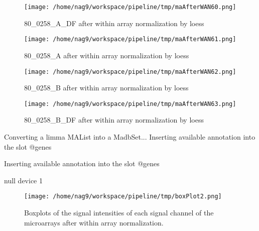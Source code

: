 \documentclass[titlepage]{article}
\begin{document}
\begin{figure}[htb!]
\centering\texttt{[image: /home/nag9/workspace/pipeline/tmp/maAfterWAN60.png]}
\caption{80\_0258\_A\_DF after within array normalization by loess}
 \end{figure}\pagebreak
\begin{figure}[htb!]
\centering\texttt{[image: /home/nag9/workspace/pipeline/tmp/maAfterWAN61.png]}
\caption{80\_0258\_A after within array normalization by loess}
 \end{figure}\pagebreak
\begin{figure}[htb!]
\centering\texttt{[image: /home/nag9/workspace/pipeline/tmp/maAfterWAN62.png]}
\caption{80\_0258\_B after within array normalization by loess}
 \end{figure}\pagebreak
\begin{figure}[htb!]
\centering\texttt{[image: /home/nag9/workspace/pipeline/tmp/maAfterWAN63.png]}
\caption{80\_0258\_B\_DF after within array normalization by loess}
 \end{figure}\pagebreak

\begin{Schunk}
\begin{Soutput}
Converting a limma MAList into a MadbSet...
Inserting available annotation into the slot @genes

Inserting available annotation into the slot @genes

null device 
          1 
\end{Soutput}
\end{Schunk}
\begin{figure}[htb!]
\centering
\texttt{[image: /home/nag9/workspace/pipeline/tmp/boxPlot2.png]}
 \caption{Boxplots of the signal intensities of each signal channel of the microarrays after within array normalization.}\end{figure}\pagebreak
\end{document}
